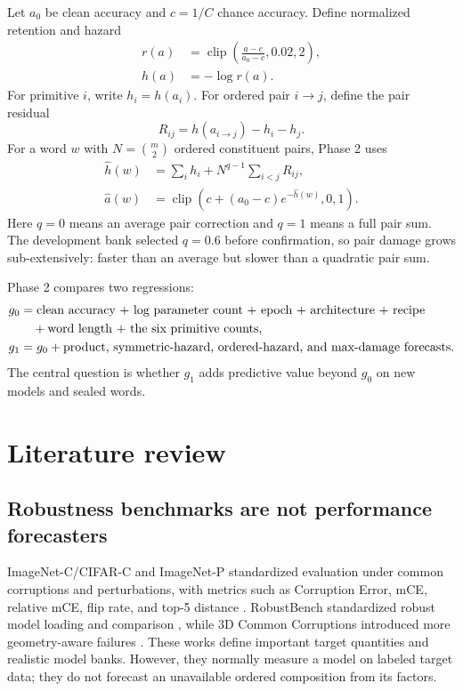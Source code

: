 \documentclass[11pt,a4paper]{article}
\newcommand{\clip}{\operatorname{clip}}
\begin{document}
Let $a_0$ be clean accuracy and $c=1/C$ chance accuracy.  Define normalized
retention and hazard
\begin{align}
r(a)&=\clip\!\left(\frac{a-c}{a_0-c},0.02,2\right),\\
h(a)&=-\log r(a).
\end{align}
For primitive $i$, write $h_i=h(a_i)$.  For ordered pair $i\to j$, define the
pair residual
\begin{equation}
R_{ij}=h(a_{i\to j})-h_i-h_j.
\end{equation}
For a word $w$ with $N=\binom{m}{2}$ ordered constituent pairs, Phase 2 uses
\begin{align}
\widehat h(w)&=\sum_i h_i+N^{q-1}\sum_{i<j}R_{ij},\\
\widehat a(w)&=\clip\!\left(c+(a_0-c)e^{-\widehat h(w)},0,1\right).
\label{eq:hazard}
\end{align}
Here $q=0$ means an average pair correction and $q=1$ means a full pair sum.
The development bank selected $q=0.6$ before confirmation, so pair damage grows
sub-extensively: faster than an average but slower than a quadratic pair sum.

Phase 2 compares two regressions:
\begin{align}
g_0 &= \text{clean accuracy + log parameter count + epoch + architecture
+ recipe} \notag\\
&\quad +\text{word length + the six primitive counts},\\
g_1 &= g_0 + \text{product, symmetric-hazard, ordered-hazard, and
max-damage forecasts}.
\end{align}
The central question is whether $g_1$ adds predictive value beyond $g_0$ on
new models and sealed words.

\section{Literature review}

\subsection{Robustness benchmarks are not performance forecasters}

ImageNet-C/CIFAR-C and ImageNet-P standardized evaluation under common
corruptions and perturbations, with metrics such as Corruption Error, mCE,
relative mCE, flip rate, and top-5 distance
\cite{hendrycks2019}.  RobustBench standardized robust model loading and
comparison \cite{croce2021}, while 3D Common Corruptions introduced more
geometry-aware failures \cite{kar2022}.  These works define important target
quantities and realistic model banks.  However, they normally measure a model
on labeled target data; they do not forecast an unavailable ordered
composition from its factors.
\end{document}

